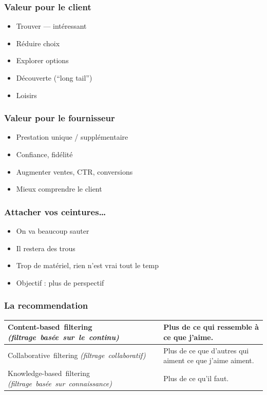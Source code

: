 \documentclass[t]{beamer}
\newcommand\topstrut{\rule{0pt}{2.6ex}}
\newcommand\bottomstrut{\rule[-1.2ex]{0pt}{0pt}}
\begin{document}
\begin{frame}
  \frametitle{Valeur pour le client}
  \begin{itemize}
  \item Trouver --- intéressant
  \item Réduire choix
  \item Explorer options
  \item Découverte (``long tail'')
  \item Loisirs
  \end{itemize}
\end{frame}

\begin{frame}
  \frametitle{Valeur pour le fournisseur}

  \begin{itemize}
  \item Prestation unique / supplémentaire
  \item Confiance, fidélité
  \item Augmenter ventes, CTR, conversions
  \item Mieux comprendre le client
  \end{itemize}
\end{frame}

\begin{frame}
  \frametitle{Attacher vos ceintures\dots}

  \begin{itemize}
  \item On va beaucoup sauter
  \item Il restera des trous
  \item Trop de matériel, rien n'est vrai tout le temp
  \item Objectif : plus de perspectif
  \end{itemize}
\end{frame}


\begin{frame}
  \frametitle{La recommendation}

  \begin{tabular}{|p{5.7cm}|p{4cm}|}
    \hline
    \topstrut\hbox{Content-based filtering}
    \hbox{\it (filtrage basée sur le continu)}
    &
    Plus de ce qui ressemble à ce que j'aime.\bottomstrut
    \\
    \hline
    \topstrut\hbox{Collaborative filtering}
    \hbox{\it (filtrage collaboratif)}
    &
    Plus de ce que d'autres qui aiment ce que j'aime aiment.\bottomstrut
    \\
    \hline
    \topstrut\hbox{Knowledge-based filtering}
    \hbox{\it (filtrage basée sur connaissance)}\bottomstrut
    &
    Plus de ce qu'il faut.\bottomstrut
    \\
    \hline
  \end{tabular}
\end{frame}
\end{document}
